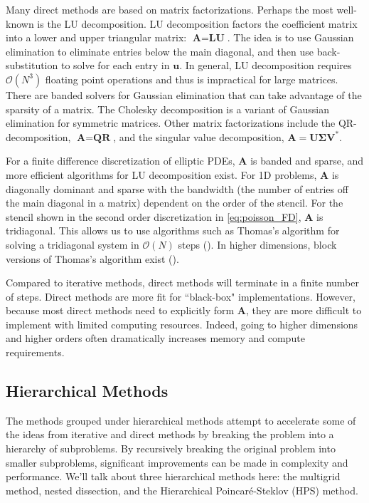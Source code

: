Many direct methods are based on matrix factorizations. Perhaps the most well-known is the LU decomposition. LU decomposition factors the coefficient matrix into a lower and upper triangular matrix: $\textbf{A} = \textbf{L} \textbf{U}$. The idea is to use Gaussian elimination to eliminate entries below the main diagonal, and then use back-substitution to solve for each entry in $\textbf{u}$. In general, LU decomposition requires $\mathcal{O}(N^3)$ floating point operations and thus is impractical for large matrices. There are banded solvers for Gaussian elimination that can take advantage of the sparsity of a matrix. The Cholesky decomposition is a variant of Gaussian elimination for symmetric matrices. Other matrix factorizations include the QR-decomposition, $\textbf{A} = \textbf{Q} \textbf{R}$, and the singular value decomposition, $\textbf{A} = \textbf{U} \boldsymbol{\Sigma} \textbf{V}^*$.

For a finite difference discretization of elliptic PDEs, $\textbf{A}$ is banded and sparse, and more efficient algorithms for LU decomposition exist. For 1D problems, $\textbf{A}$ is diagonally dominant and sparse with the bandwidth (the number of entries off the main diagonal in a matrix) dependent on the order of the stencil. For the stencil shown in the second order discretization in \ref{eq:poisson_FD}, $\textbf{A}$ is tridiagonal. This allows us to use algorithms such as Thomas's algorithm for solving a tridiagonal system in $\mathcal{O}(N)$ steps (\cite{higham2002accuracy}). In higher dimensions, block versions of Thomas's algorithm exist (\cite{quarteroni2010numerical}).

Compared to iterative methods, direct methods will terminate in a finite number of steps. Direct methods are more fit for ``black-box" implementations. However, because most direct methods need to explicitly form $\textbf{A}$, they are more difficult to implement with limited computing resources. Indeed, going to higher dimensions and higher orders often dramatically increases memory and compute requirements.

\subsection{Hierarchical Methods}
\label{sub:hierarchical-methods}

The methods grouped under hierarchical methods attempt to accelerate some of the ideas from iterative and direct methods by breaking the problem into a hierarchy of subproblems. By recursively breaking the original problem into smaller subproblems, significant improvements can be made in complexity and performance. We'll talk about three hierarchical methods here: the multigrid method, nested dissection, and the Hierarchical Poincaré-Steklov (HPS) method.

